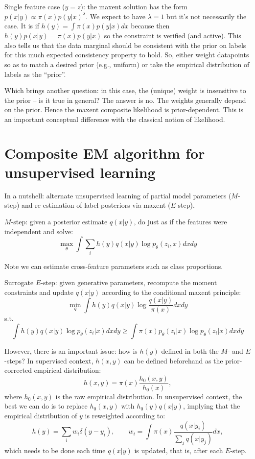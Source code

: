 \documentclass[english]{scrartcl}
\begin{document}
Single feature case ($y=z$): the maxent solution has the form $p(x|y)\propto\pi(x)p(y|x)^\lambda$. We expect to have $\lambda=1$ but it's not necessarily the case. It is if $h(y)=\int\pi(x)p(y|x)dx$ because then $h(y)p(x|y)=\pi(x)p(y|x)$ so the constraint is verified (and active). This also tells us that the data marginal should be consistent with the prior on labels for this much expected consistency property to hold. So, either weight datapoints so as to match a desired prior (e.g., uniform) or take the empirical distribution of labels as the ``prior''. 

Which brings another question: in this case, the (unique) weight is insensitive to the prior -- is it true in general? The answer is no. The weights generally depend on the prior. Hence the maxent composite likelihood is prior-dependent. This is an important conceptual difference with the classical notion of likelihood.


\section{Composite EM algorithm for unsupervised learning}
\label{sec:gem}

In a nutshell: alternate unsupervised learning of partial model parameters ($M$-step) and re-estimation of label posteriors via maxent ($E$-step). 

$M$-step: given a posterior estimate $q(x|y)$, do just as if the features were independent and solve: 
$$
\max_\theta
\int \sum_i h(y)q(x|y) \log p_\theta(z_i,x) dx dy
$$

Note we can estimate cross-feature parameters such as class proportions.

Surrogate $E$-step: given generative parameters, recompute the moment constraints and update $q(x|y)$ according to the conditional maxent principle:
$$
\min_q
\int h(y)q(x|y) \log \frac{q(x|y)}{\pi(x)} dx dy
$$
s.t.
$$
\int h(y)q(x|y)\log p_\theta(z_i|x) dx dy \geq \int \pi(x)p_\theta(z_i|x)\log p_\theta(z_i|x) dx dy
$$

However, there is an important issue: how is $h(y)$ defined in both the $M$- and $E$-steps? In supervised context, $h(x,y)$ can be defined beforehand as the prior-corrected empirical distribution:
$$
h(x,y) = \pi(x) \frac{h_0(x,y)}{h_0(x)},
$$
where $h_0(x,y)$ is the raw empirical distribution. In unsupervised context, the best we can do is to replace $h_0(x,y)$ with $h_0(y)q(x|y)$, implying that the empirical distribution of $y$ is reweighted according to:
$$
h(y) = \sum_i w_i\delta(y-y_i),
\qquad
w_i = \int \pi(x)\frac{q(x|y_i)}{\sum_j q(x|y_j)} dx,
$$
which needs to be done each time $q(x|y)$ is updated, that is, after each $E$-step.
\end{document}
